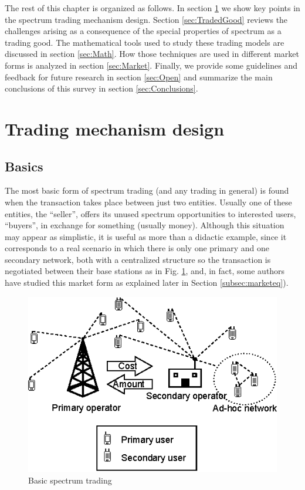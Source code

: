 The rest of this chapter is organized as follows. In section \ref{sec:Trading} we show key points in the spectrum trading mechanism design. Section \ref{sec:TradedGood} reviews the challenges arising as a consequence of the special properties of spectrum as a trading good. The mathematical tools used to study these trading models are discussed in section \ref{sec:Math}. How those techniques are used in different market forms is analyzed in section \ref{sec:Market}. Finally, we provide some guidelines and feedback for future research in section \ref{sec:Open} and summarize the main conclusions of this survey in section \ref{sec:Conclusions}.

\section{Trading mechanism design} 
\label{sec:Trading}
\subsection{Basics} 
\label{subsec:When}
The most basic form of spectrum trading (and any trading in general) is found when the transaction takes place between just two entities. Usually one of these entities, the ``seller'', offers its unused spectrum opportunities to interested users, ``buyers'', in exchange for something (usually money). Although this situation may appear as simplistic, it is useful as more than a didactic example, since it corresponds to a real scenario in which there is only one primary and one secondary network, both with a centralized structure so the transaction is negotiated between their base stations as in Fig. \ref{fig:BasicMarket}, and, in fact, some authors have studied this market form as explained later in Section \ref{subsec:marketeq}). 

\begin{figure}[!ht]
  \begin{center}
  \includegraphics[scale=1.25]{Fig1.eps}
  \end{center}
  \caption{Basic spectrum trading}
   \label{fig:BasicMarket}
\end{figure}

